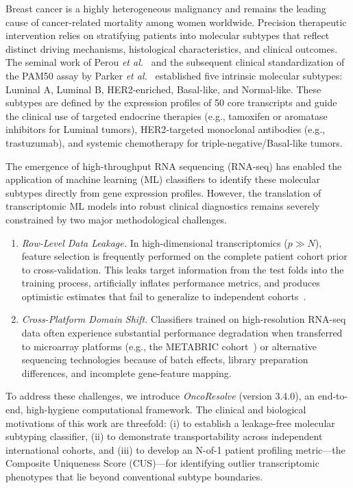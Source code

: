 \documentclass[10pt,a4paper,twocolumn]{article}
\begin{document}
Breast cancer is a highly heterogeneous malignancy and remains the leading cause of cancer-related mortality among women worldwide. Precision therapeutic intervention relies on stratifying patients into molecular subtypes that reflect distinct driving mechanisms, histological characteristics, and clinical outcomes. The seminal work of Perou \textit{et al.}~\cite{perou2000} and the subsequent clinical standardization of the PAM50 assay by Parker \textit{et al.}~\cite{parker2009} established five intrinsic molecular subtypes: Luminal A, Luminal B, HER2-enriched, Basal-like, and Normal-like. These subtypes are defined by the expression profiles of 50 core transcripts and guide the clinical use of targeted endocrine therapies (e.g., tamoxifen or aromatase inhibitors for Luminal tumors), HER2-targeted monoclonal antibodies (e.g., trastuzumab), and systemic chemotherapy for triple-negative/Basal-like tumors.

The emergence of high-throughput RNA sequencing (RNA-seq) has enabled the application of machine learning (ML) classifiers to identify these molecular subtypes directly from gene expression profiles. However, the translation of transcriptomic ML models into robust clinical diagnostics remains severely constrained by two major methodological challenges.

\begin{enumerate}
    \item \textit{Row-Level Data Leakage.} In high-dimensional transcriptomics ($p \gg N$), feature selection is frequently performed on the complete patient cohort prior to cross-validation. This leaks target information from the test folds into the training process, artificially inflates performance metrics, and produces optimistic estimates that fail to generalize to independent cohorts~\cite{kapoor2022}.

    \item \textit{Cross-Platform Domain Shift.} Classifiers trained on high-resolution RNA-seq data often experience substantial performance degradation when transferred to microarray platforms (e.g., the METABRIC cohort~\cite{curtis2012}) or alternative sequencing technologies because of batch effects, library preparation differences, and incomplete gene-feature mapping.
\end{enumerate}

To address these challenges, we introduce \textit{OncoResolve} (version 3.4.0), an end-to-end, high-hygiene computational framework. The clinical and biological motivations of this work are threefold: (i) to establish a leakage-free molecular subtyping classifier, (ii) to demonstrate transportability across independent international cohorts, and (iii) to develop an N-of-1 patient profiling metric---the Composite Uniqueness Score (CUS)---for identifying outlier transcriptomic phenotypes that lie beyond conventional subtype boundaries.
\end{document}
